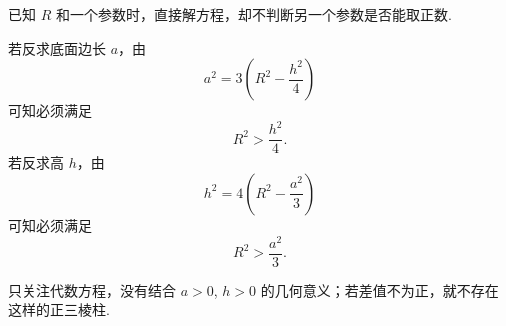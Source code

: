 \begin{trapbox}
	\medskip
	\begin{description}[style=nextline, leftmargin=2.8em, labelsep=0.5em, itemsep=0.35em]
		\item[\textbf{\textcolor{CTrap}{易错点四（反求参数不验存在性）}}] 已知 $R$ 和一个参数时，直接解方程，却不判断另一个参数是否能取正数.
		\item[\textbf{\textcolor{CTrap}{正确理解（先看差值是否为正）：}}] 若反求底面边长 $a$，由
		      \[
			      a^{2}=3\left(R^{2}-\frac{h^{2}}{4}\right)
		      \]
		      可知必须满足
		      \[
			      R^{2}>\frac{h^{2}}{4}.
		      \]
		      若反求高 $h$，由
		      \[
			      h^{2}=4\left(R^{2}-\frac{a^{2}}{3}\right)
		      \]
		      可知必须满足
		      \[
			      R^{2}>\frac{a^{2}}{3}.
		      \]
		\item[\textbf{\textcolor{CTrap}{错因分析（只算不判）：}}] 只关注代数方程，没有结合 $a>0$, $h>0$ 的几何意义；若差值不为正，就不存在这样的正三棱柱.
	\end{description}
\end{trapbox}